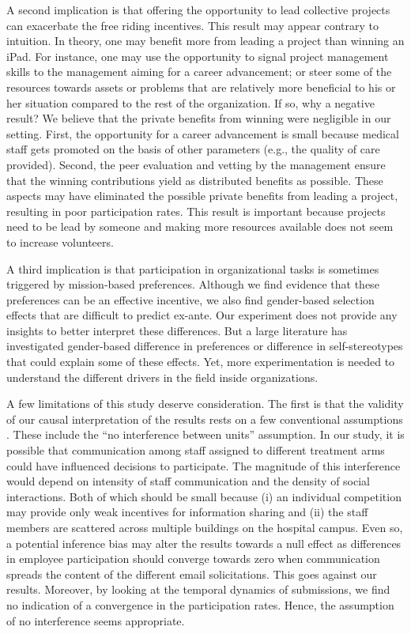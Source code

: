 \documentclass[12pt, titlepage]{article}
\begin{document}
A second implication is that offering the opportunity to lead collective
projects can exacerbate the free riding incentives. This result may
appear contrary to intuition. In theory, one may benefit more from
leading a project than winning an iPad. For instance, one may use the
opportunity to signal project management skills to the management aiming
for a career advancement; or steer some of the resources towards assets
or problems that are relatively more beneficial to his or her situation
compared to the rest of the organization. If so, why a negative result?
We believe that the private benefits from winning were negligible in our
setting. First, the opportunity for a career advancement is small
because medical staff gets promoted on the basis of other parameters
(e.g., the quality of care provided). Second, the peer evaluation and
vetting by the management ensure that the winning contributions yield as
distributed benefits as possible. These aspects may have eliminated the
possible private benefits from leading a project, resulting in poor
participation rates. This result is important because projects need to
be lead by someone and making more resources available does not seem to
increase volunteers.

A third implication is that participation in organizational tasks is
sometimes triggered by mission-based preferences. Although we find
evidence that these preferences can be an effective incentive, we also
find gender-based selection effects that are difficult to predict
ex-ante. Our experiment does not provide any insights to better
interpret these differences. But a large literature has investigated
gender-based difference in preferences \citep[see][ for a
review]{croson2009gender} or difference in self-stereotypes
\citep{coffman2014evidence} that could explain some of these effects.
Yet, more experimentation is needed to understand the different drivers
in the field inside organizations.

A few limitations of this study deserve consideration. The first is that
the validity of our causal interpretation of the results rests on a few
conventional assumptions \citep{rubin1974estimating}. These include the
``no interference between units'' assumption. In our study, it is
possible that communication among staff assigned to different treatment
arms could have influenced decisions to participate. The magnitude of
this interference would depend on intensity of staff communication and
the density of social interactions. Both of which should be small
because (i) an individual competition may provide only weak incentives
for information sharing and (ii) the staff members are scattered across
multiple buildings on the hospital campus. Even so, a potential
inference bias may alter the results towards a null effect as
differences in employee participation should converge towards zero when
communication spreads the content of the different email solicitations.
This goes against our results. Moreover, by looking at the temporal
dynamics of submissions, we find no indication of a convergence in the
participation rates. Hence, the assumption of no interference seems
appropriate.
\end{document}
